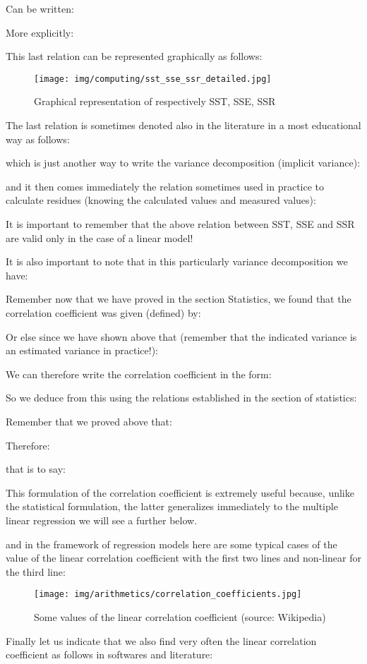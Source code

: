 	Can be written:
	
	More explicitly:
	
	This last relation can be represented graphically as follows:
	\begin{figure}[H]
		\centering
		\texttt{[image: img/computing/sst\_sse\_ssr\_detailed.jpg]}
		\caption{Graphical representation of respectively SST, SSE, SSR}
	\end{figure}

The last relation is sometimes denoted also in the literature in a most educational way as follows:

	which is just another way to write the variance decomposition (implicit variance):
	
	
	and it then comes immediately the relation sometimes used in practice to calculate residues (knowing the calculated values and measured values):
	
	It is important to remember that the above relation between SST, SSE and SSR are valid only in the case of a linear model!
	
	It is also important to note that in this particularly variance decomposition we have:
	
	Remember now that we have proved in the section Statistics, we found that the correlation coefficient was given (defined) by\label{correlation coefficient numerical methods}:
	
	Or else since we have shown above that (remember that the indicated variance is an estimated variance in practice!):
	
	We can therefore write the correlation coefficient in the form:
	
	So we deduce from this using the relations established in the section of statistics:
	
	Remember that we proved above that:
	
	Therefore:
	
	that is to say:
	
	\begin{tcolorbox}[title=Remark,colframe=black,arc=10pt]
This formulation of the correlation coefficient is extremely useful because, unlike the statistical formulation, the latter generalizes immediately to the multiple linear regression we will see a further below.
	\end{tcolorbox}
	and in the framework of regression models here are some typical cases of the value of the linear correlation coefficient with the first two lines and non-linear for the third line:
\begin{figure}[H]
	\centering
	\texttt{[image: img/arithmetics/correlation\_coefficients.jpg]}
	\caption[Some values of the linear correlation coefficient]{Some values of the linear correlation coefficient (source: Wikipedia)}
\end{figure}
	Finally let us indicate that we also find very often the linear correlation coefficient as follows in softwares and literature:
	
